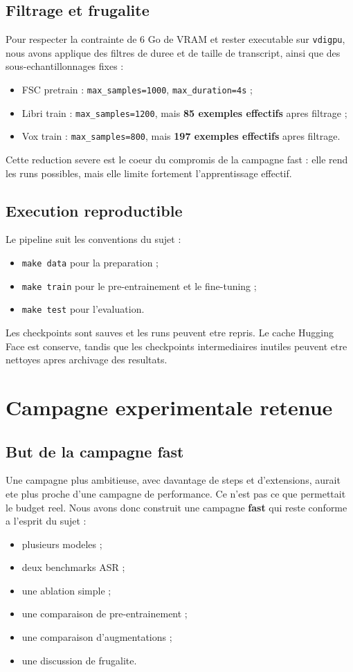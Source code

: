 \documentclass[11pt,a4paper]{article}
\begin{document}
\subsection{Filtrage et frugalite}
Pour respecter la contrainte de 6 Go de VRAM et rester executable sur \texttt{vdigpu}, nous avons applique des filtres de duree et de taille de transcript, ainsi que des sous-echantillonnages fixes :
\begin{itemize}[leftmargin=1.2cm]
\item FSC pretrain : \texttt{max\_samples=1000}, \texttt{max\_duration=4s} ;
\item Libri train : \texttt{max\_samples=1200}, mais \textbf{85 exemples effectifs} apres filtrage ;
\item Vox train : \texttt{max\_samples=800}, mais \textbf{197 exemples effectifs} apres filtrage.
\end{itemize}

Cette reduction severe est le coeur du compromis de la campagne fast : elle rend les runs possibles, mais elle limite fortement l'apprentissage effectif.

\subsection{Execution reproductible}
Le pipeline suit les conventions du sujet :
\begin{itemize}[leftmargin=1.2cm]
\item \texttt{make data} pour la preparation ;
\item \texttt{make train} pour le pre-entrainement et le fine-tuning ;
\item \texttt{make test} pour l'evaluation.
\end{itemize}

Les checkpoints sont sauves et les runs peuvent etre repris. Le cache Hugging Face est conserve, tandis que les checkpoints intermediaires inutiles peuvent etre nettoyes apres archivage des resultats.

\section{Campagne experimentale retenue}
\subsection{But de la campagne fast}
Une campagne plus ambitieuse, avec davantage de steps et d'extensions, aurait ete plus proche d'une campagne de performance. Ce n'est pas ce que permettait le budget reel. Nous avons donc construit une campagne \textbf{fast} qui reste conforme a l'esprit du sujet :
\begin{itemize}[leftmargin=1.2cm]
\item plusieurs modeles ;
\item deux benchmarks ASR ;
\item une ablation simple ;
\item une comparaison de pre-entrainement ;
\item une comparaison d'augmentations ;
\item une discussion de frugalite.
\end{itemize}
\end{document}
